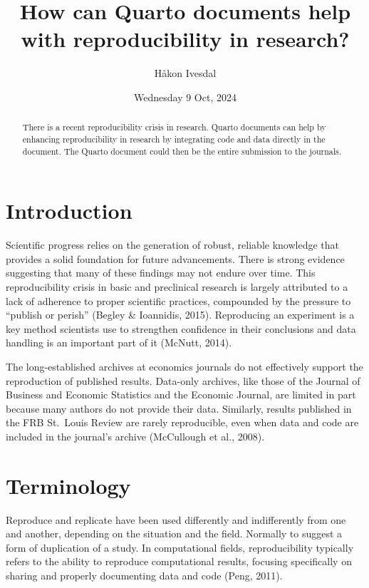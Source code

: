 \documentclass[
  a4paper,
]{article}
\title{How can Quarto documents help with reproducibility in research?}
\author{Håkon Ivesdal}
\date{Wednesday 9 Oct, 2024}
\begin{document}
\maketitle
\begin{abstract}
There is a recent reproducibility crisis in research. Quarto documents
can help by enhancing reproducibility in research by integrating code
and data directly in the document. The Quarto document could then be the
entire submission to the journals.
\end{abstract}


\section{Introduction}\label{introduction}

Scientific progress relies on the generation of robust, reliable
knowledge that provides a solid foundation for future advancements.
There is strong evidence suggesting that many of these findings may not
endure over time. This reproducibility crisis in basic and preclinical
research is largely attributed to a lack of adherence to proper
scientific practices, compounded by the pressure to ``publish or
perish'' (Begley \& Ioannidis, 2015). Reproducing an experiment is a key
method scientists use to strengthen confidence in their conclusions and
data handling is an important part of it (McNutt, 2014).

The long-established archives at economics journals do not effectively
support the reproduction of published results. Data-only archives, like
those of the Journal of Business and Economic Statistics and the
Economic Journal, are limited in part because many authors do not
provide their data. Similarly, results published in the FRB St.~Louis
Review are rarely reproducible, even when data and code are included in
the journal's archive (McCullough et al., 2008).

\section{Terminology}\label{terminology}

Reproduce and replicate have been used differently and indifferently
from one and another, depending on the situation and the field. Normally
to suggest a form of duplication of a study. In computational fields,
reproducibility typically refers to the ability to reproduce
computational results, focusing specifically on sharing and properly
documenting data and code (Peng, 2011).
\end{document}
